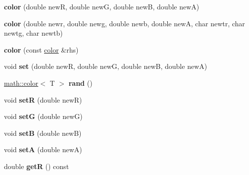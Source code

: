 \begin{DoxyCompactItemize}
\item 
\hypertarget{classmath_1_1color_a8b349f74b15ac1bd0b11e7e336a0c8db}{
{\bfseries color} (double newR, double newG, double newB, double newA)}
\label{classmath_1_1color_a8b349f74b15ac1bd0b11e7e336a0c8db}

\item 
\hypertarget{classmath_1_1color_afe481012b5fc3cb916969afd2b9763ab}{
{\bfseries color} (double newr, double newg, double newb, double newA, char newtr, char newtg, char newtb)}
\label{classmath_1_1color_afe481012b5fc3cb916969afd2b9763ab}

\item 
\hypertarget{classmath_1_1color_a3ecb3c0d622dd10474efb8748860eae1}{
{\bfseries color} (const \hyperlink{classmath_1_1color}{color} \&rhs)}
\label{classmath_1_1color_a3ecb3c0d622dd10474efb8748860eae1}

\item 
\hypertarget{classmath_1_1color_aa5bfbe88dfeacf3ae0ffa26125b1c81d}{
void {\bfseries set} (double newR, double newG, double newB, double newA)}
\label{classmath_1_1color_aa5bfbe88dfeacf3ae0ffa26125b1c81d}

\item 
\hypertarget{classmath_1_1color_a264045cfbf455d0d0de01a62c96c561c}{
\hyperlink{classmath_1_1color}{math::color}$<$ T $>$ {\bfseries rand} ()}
\label{classmath_1_1color_a264045cfbf455d0d0de01a62c96c561c}

\item 
\hypertarget{classmath_1_1color_ab7a2635e2aeabe921bd88c029199de34}{
void {\bfseries setR} (double newR)}
\label{classmath_1_1color_ab7a2635e2aeabe921bd88c029199de34}

\item 
\hypertarget{classmath_1_1color_a39f9dc1ca964c72be7fba9f63125adca}{
void {\bfseries setG} (double newG)}
\label{classmath_1_1color_a39f9dc1ca964c72be7fba9f63125adca}

\item 
\hypertarget{classmath_1_1color_a447b25b0c2442c60f3858849c091fe65}{
void {\bfseries setB} (double newB)}
\label{classmath_1_1color_a447b25b0c2442c60f3858849c091fe65}

\item 
\hypertarget{classmath_1_1color_acf5d5da2c6d8c598ed8dc29cfdee6f04}{
void {\bfseries setA} (double newA)}
\label{classmath_1_1color_acf5d5da2c6d8c598ed8dc29cfdee6f04}

\item 
\hypertarget{classmath_1_1color_a8bdc7015974193bbda7e9ff6f3b1bb5c}{
double {\bfseries getR} () const }
\label{classmath_1_1color_a8bdc7015974193bbda7e9ff6f3b1bb5c}


\end{DoxyCompactItemize}
